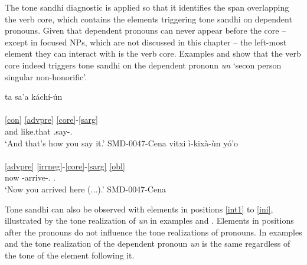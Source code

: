 \documentclass[output=paper]{langscibook}
\begin{document}
The tone sandhi diagnostic is applied so that it identifies the span overlapping the verb core, which contains the elements triggering tone sandhi on dependent pronouns.
Given that dependent pronouns can never appear before the core -- except in focused NPs, which are not discussed in this chapter -- the left-most element they can interact with is the verb core. 
Examples  and   show that the verb core indeed triggers tone sandhi on the dependent pronoun \emph{un} `secon person singular non-honorific'.

\ea
    \ea \label{ex:sandhicore1}
    \gllll ta sa'a káchí-ún \\
        [ta³ sa³ʔa³ ka⁵tʃi⁵-ũ⁵]\\
        \ref{con} \ref{advpre} \ref{core}-\ref{sarg} \\
        and like.that \Incmpl.say-\Ssg.\Nhon{} \\
    \glt `And that's how you say it.' \hfill SMD-0047-Cena
    \ex \label{ex:sandhicore2}
    \gllll vitxi ì-kixà-ùn yó'o \\
        [βi³tɕi³ i¹-ki³ɕa¹-ũ¹ ʒo⁵ʔo³] \\
        \ref{advpre} \ref{irrneg}-\ref{core}-\ref{sarg} \ref{obl} \\
        now \Cmpl-arrive-\Ssg.\Nhon{} \Dem.\Prox{} \\
    \glt `Now you arrived here (...).' \hfill SMD-0047-Cena
    \z
\z

Tone sandhi can also be observed with elements in positions \ref{int1} to \ref{ini}, illustrated by the tone realization of \emph{un} in examples  and .
Elements in positions after the pronouns do not influence the tone realizations of pronouns.
In examples  and   the tone realization of the dependent pronoun \emph{un} is the same regardless of the tone of the element following it.
\end{document}
